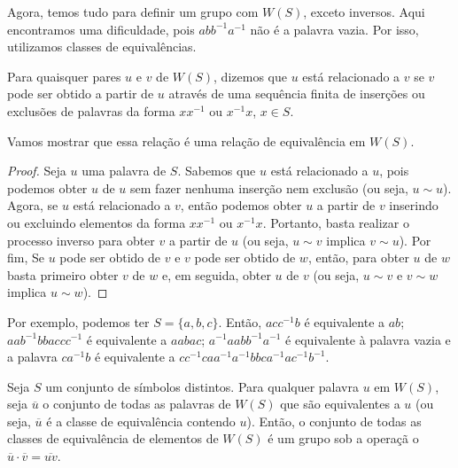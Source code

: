 	\par\vspace{0.3cm} Agora, temos tudo para definir um grupo com $W(S)$, exceto inversos. 
	Aqui encontramos uma dificuldade, pois $abb^{-1}a^{-1}$ não é a palavra vazia. Por isso, 
	utilizamos classes de equivalências.
	\begin{deff}
		Para quaisquer pares $u$ e $v$ de $W(S)$, dizemos que $u$ está relacionado a $v$ se $v$ 
		pode ser obtido a partir de $u$ através de uma sequência finita de inserções ou exclusões 
		de palavras da forma $xx^{-1}$ ou $x^{-1}x$, $x\in S$.
	\end{deff}
	\par\vspace{0.3cm} Vamos mostrar que essa relação é uma relação de equivalência em $W(S)$.
	\begin{proof}
		Seja $u$ uma palavra de $S$. Sabemos que $u$ está relacionado a $u$, pois podemos 
		obter $u$ de $u$ sem fazer nenhuma inserção nem exclusão (ou seja, $u\sim u$). 
		Agora, se $u$ está relacionado a $v$, então podemos obter $u$ a partir de $v$ 
		inserindo ou excluindo elementos da forma $xx^{-1}$ ou $x^{-1}x$. 
		Portanto, basta realizar o processo inverso para obter $v$ a partir de $u$ 
		(ou seja, $u\sim v$ implica $v\sim u$). Por fim, Se $u$ pode ser obtido de $v$ e 
		$v$ pode ser obtido de $w$, então, para obter $u$ de $w$ basta primeiro obter 
		$v$ de $w$ e, em seguida, obter $u$ de $v$ (ou seja, $u\sim v$ e $v\sim w$ implica $u\sim w$).
	\end{proof}
	\par\vspace{0.3cm} Por exemplo, podemos ter $S = \{a, b, c\}$. Então, $acc^{-1}b$ é equivalente 
	a $ab$; $aab^{-1}bbaccc^{-1}$ é equivalente a $aabac$; $a^{-1}aabb^{-1}a^{-1}$ é equivalente à 
	palavra vazia e a palavra $ca^{-1}b$ é equivalente a $cc^{-1}caa^{-1}a^{-1}bbca^{-1}ac^{-1}b^{-1}$.
	\begin{theorem}
	\label{grupo livre}
		Seja $S$ um conjunto de símbolos distintos. Para qualquer palavra $u$ em $W(S)$, seja 
		$\overline{u}$ o conjunto de todas as palavras de $W(S)$ que são equivalentes a $u$ 
		(ou seja, $\overline{u}$ é a classe de equivalência contendo $u$). Então, o conjunto 
		de todas as classes de equivalência de elementos de $W(S)$ é um grupo sob a operaçã
		o $\overline{u}\cdot\overline{v} = \overline{uv}$. 
	\end{theorem}
